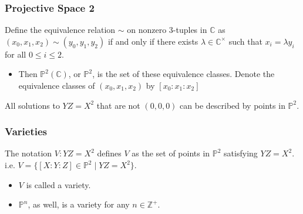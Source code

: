 \documentclass{beamer}
\theoremstyle{definition}
\begin{document}
    \begin{frame}

        \frametitle{Projective Space 2}
        Define the equivalence relation \(\sim\) on nonzero \(3\)-tuples in \(\mathbb{C}\) as \((x_0, x_1, x_{2}) \sim (y_0, y_1, y_{2})\) if and only if there exists \(\lambda \in \mathbb{C}^\times\) such that \(x_i = \lambda y_i\) for all \(0\leq i\leq 2\).
        \begin{itemize}
            \item[\textrightarrow] Then \(\mathbb{P}^2(\mathbb{C})\), or \(\mathbb{P}^2\), is the set of these equivalence classes. Denote the equivalence classes of \((x_0, x_1, x_2)\) by \([x_0: x_1: x_2]\)
 \end{itemize}

 All solutions to \(YZ = X^2\) that are not \((0, 0, 0)\) can be described by points in \(\mathbb{P}^2\).
\end{frame}

\begin{frame}
    \frametitle{Varieties}
    The notation \(V: YZ = X^2\) defines \(V\) as the set of points in \(\mathbb{P}^2\) satisfying \(YZ = X^2\). i.e. \(V = \{[X:Y:Z]\in \mathbb{P}^2 \mid YZ = X^2 \}\).
\begin{itemize}
    \item[\textrightarrow] \(V\) is called a variety.
    \item[\textrightarrow] \(\mathbb{P}^n\), as well, is a variety for any \(n\in \mathbb{Z}^+\).

\end{itemize}
\end{frame}
\end{document}
